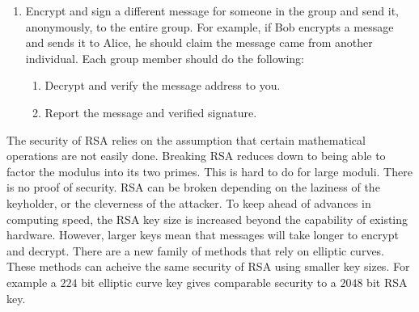 \begin{problem}
\begin{enumerate}
\item Encrypt and sign a different message for someone in the group and send it, anonymously, to the entire group.
For example, if Bob encrypts a message and sends it to Alice, he should claim the message came from another individual.
Each group member should do the following:
\begin{enumerate}
\item Decrypt and verify the message address to you.
\item Report the message and verified signature.
\end{enumerate}
\end{enumerate}
\end{problem}

The security of RSA relies on the assumption that certain mathematical operations are not easily done.
Breaking RSA reduces down to being able to factor the modulus into its two primes.  This is hard to do for large moduli.
There is no proof of security.  RSA can be broken depending on the laziness of the keyholder, or the cleverness of the attacker.
To keep ahead of advances in computing speed, the RSA key size is increased beyond the capability of existing hardware.
However, larger keys mean that messages will take longer to encrypt and decrypt.
There are a new family of methods that rely on elliptic curves.
These methods can acheive the same security of RSA using smaller key sizes.
For example a $224$ bit elliptic curve key gives comparable security to a $2048$ bit RSA key.